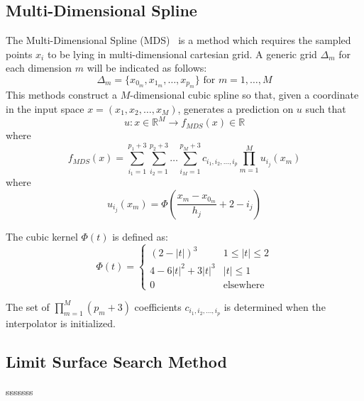 \subsection{Multi-Dimensional Spline}
\label{sec:ND_spline}
The Multi-Dimensional Spline (MDS)~\cite{MD_spline} is a method which requires the sampled points $x_i$ to be lying in multi-dimensional cartesian grid.
A generic grid $\Delta_m$ for each dimension $m$ will be indicated as follows:
\begin{equation}
\Delta_m = \{x_{0_m},x_{1_m},\ldots,x_{p_m}\} \text{ for } m=1,\ldots,M
\end{equation}
This methods construct a $M$-dimensional cubic spline so that, given a coordinate in the input space $x=(x_1,x_2,\ldots,x_M)$, generates a prediction on $u$ such that 
\begin{equation}
u:x \in \mathbb{R}^M \rightarrow f_{MDS}(x) \in \mathbb{R}
\end{equation}
where
\begin{equation}
f_{MDS}(x)=\sum_{i_1=1}^{p_1+3} \sum_{i_2=1}^{p_2+3} \ldots \sum_{i_M=1}^{p_M+3} c_{i_1,i_2,\ldots,i_p} \prod_{m=1}^{M} u_{i_j} (x_m)
\end{equation}
where 
\begin{equation}
u_{i_j} (x_m) = \Phi\left ( \frac{x_m-x_{0_m}}{h_j}+2-i_j  \right )
\end{equation}

The cubic kernel $\Phi(t)$ is defined as:
\begin{equation}
\Phi(t) = \left\{\begin{matrix}
(2-\left | t \right |)^3 & 1\leq \left | t \right |\leq 2 \\
4-6\left | t \right |^2+3\left | t \right |^3 & \left | t \right |\leq 1\\ 
0 & \text{elsewhere}
\end{matrix}\right.
\end{equation}

The set of $\prod_{m=1}^{M}(p_m+3)$ coefficients $c_{i_1,i_2,\ldots,i_p}$  is determined when the interpolator is initialized.




\subsection{Limit Surface Search Method}
\label{sub:LS}
sssssss



